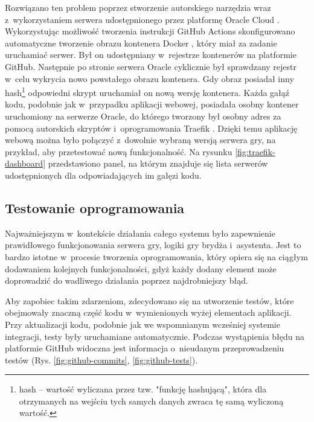 Rozwiązano ten problem poprzez stworzenie autorskiego
narzędzia wraz z~wykorzystaniem serwera udostępnionego
przez platformę Oracle Cloud \cite{OracleCloud}.
Wykorzystując możliwość tworzenia instrukcji GitHub Actions
skonfigurowano automatyczne tworzenie obrazu kontenera
Docker \cite{Docker}, który miał za zadanie uruchamiać
serwer. Był on udostępniany w~rejestrze kontenerów na
platformie GitHub. Następnie po stronie serwera Oracle
cyklicznie był sprawdzany rejestr w~celu wykrycia
nowo powstałego obrazu kontenera. Gdy obraz posiadał
inny hash\footnote{hash -- wartość wyliczana przez tzw. "funkcję
    hashującą", która dla otrzymanych na wejściu tych
    samych danych zwraca tę samą wyliczoną wartość.}
odpowiedni skrypt uruchamiał on nową wersję kontenera.
Każda gałąź kodu, podobnie jak w~przypadku aplikacji
webowej, posiadała osobny kontener uruchomiony na serwerze
Oracle, do którego tworzony był osobny adres za pomocą
autorskich skryptów i~oprogramowania Traefik \cite{Traefik}.
Dzięki temu aplikację webową można było połączyć
z~dowolnie wybraną wersją serwera gry, na przykład, aby
przetestować nową funkcjonalność. Na rysunku
\ref{fig:traefik-dashboard} przedstawiono panel, na którym
znajduje się lista serwerów udostępnionych dla
odpowiadających im gałęzi kodu.

\FloatBarrier


\subsection{Testowanie oprogramowania}

Najważniejszym w~kontekście działania całego systemu
było zapewnienie prawidłowego funkcjonowania
serwera gry, logiki gry brydża i~asystenta.
Jest to bardzo istotne w~procesie tworzenia oprogramowania,
który opiera się na ciągłym dodawaniem kolejnych
funkcjonalności, gdyż każdy dodany element może doprowadzić
do wadliwego działania poprzez najdrobniejszy błąd.

Aby zapobiec takim zdarzeniom, zdecydowano się na utworzenie
testów, które obejmowały znaczną część kodu w~wymienionych
wyżej elementach aplikacji. Przy aktualizacji kodu,
podobnie jak we wspomnianym wcześniej systemie integracji,
testy były uruchamiane automatycznie. Podczas wystąpienia
błędu na platformie GitHub widoczna jest informacja
o~nieudanym przeprowadzeniu testów
(Rys. \ref{fig:github-commits}, \ref{fig:github-tests}).

